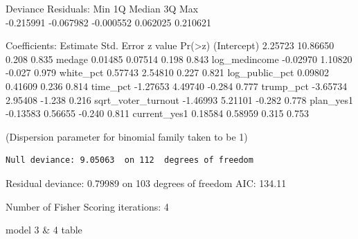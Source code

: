 \documentclass[
]{article}
\begin{document}
Deviance Residuals: Min 1Q Median 3Q Max\\
-0.215991 -0.067982 -0.000552 0.062025 0.210621

Coefficients: Estimate Std. Error z value
Pr(\textgreater\textbar z\textbar) (Intercept) 2.25723 10.86650 0.208
0.835 medage 0.01485 0.07514 0.198 0.843 log\_medincome -0.02970 1.10820
-0.027 0.979 white\_pct 0.57743 2.54810 0.227 0.821 log\_public\_pct
0.09802 0.41609 0.236 0.814 time\_pct -1.27653 4.49740 -0.284 0.777
trump\_pct -3.65734 2.95408 -1.238 0.216 sqrt\_voter\_turnout -1.46993
5.21101 -0.282 0.778 plan\_yes1 -0.13583 0.56655 -0.240 0.811
current\_yes1 0.18584 0.58959 0.315 0.753

(Dispersion parameter for binomial family taken to be 1)

\begin{verbatim}
Null deviance: 9.05063  on 112  degrees of freedom
\end{verbatim}

Residual deviance: 0.79989 on 103 degrees of freedom AIC: 134.11

Number of Fisher Scoring iterations: 4

model 3 \& 4 table
\end{document}
